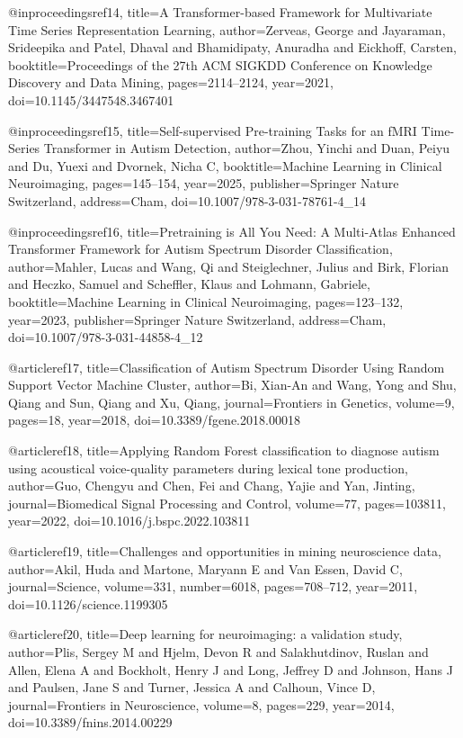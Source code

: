 @inproceedings{ref14,
  title={A Transformer-based Framework for Multivariate Time Series Representation Learning},
  author={Zerveas, George and Jayaraman, Srideepika and Patel, Dhaval and Bhamidipaty, Anuradha and Eickhoff, Carsten},
  booktitle={Proceedings of the 27th ACM SIGKDD Conference on Knowledge Discovery and Data Mining},
  pages={2114--2124},
  year={2021},
  doi={10.1145/3447548.3467401}
}

@inproceedings{ref15,
  title={Self-supervised Pre-training Tasks for an fMRI Time-Series Transformer in Autism Detection},
  author={Zhou, Yinchi and Duan, Peiyu and Du, Yuexi and Dvornek, Nicha C},
  booktitle={Machine Learning in Clinical Neuroimaging},
  pages={145--154},
  year={2025},
  publisher={Springer Nature Switzerland},
  address={Cham},
  doi={10.1007/978-3-031-78761-4_14}
}

@inproceedings{ref16,
  title={Pretraining is All You Need: A Multi-Atlas Enhanced Transformer Framework for Autism Spectrum Disorder Classification},
  author={Mahler, Lucas and Wang, Qi and Steiglechner, Julius and Birk, Florian and Heczko, Samuel and Scheffler, Klaus and Lohmann, Gabriele},
  booktitle={Machine Learning in Clinical Neuroimaging},
  pages={123--132},
  year={2023},
  publisher={Springer Nature Switzerland},
  address={Cham},
  doi={10.1007/978-3-031-44858-4_12}
}
  
@article{ref17,
  title={Classification of Autism Spectrum Disorder Using Random Support Vector Machine Cluster},
  author={Bi, Xian-An and Wang, Yong and Shu, Qiang and Sun, Qiang and Xu, Qiang},
  journal={Frontiers in Genetics},
  volume={9},
  pages={18},
  year={2018},
  doi={10.3389/fgene.2018.00018}
}

@article{ref18,
  title={Applying Random Forest classification to diagnose autism using acoustical voice-quality parameters during lexical tone production},
  author={Guo, Chengyu and Chen, Fei and Chang, Yajie and Yan, Jinting},
  journal={Biomedical Signal Processing and Control},
  volume={77},
  pages={103811},
  year={2022},
  doi={10.1016/j.bspc.2022.103811}
}

@article{ref19,
  title={Challenges and opportunities in mining neuroscience data},
  author={Akil, Huda and Martone, Maryann E and Van Essen, David C},
  journal={Science},
  volume={331},
  number={6018},
  pages={708--712},
  year={2011},
  doi={10.1126/science.1199305}
}

@article{ref20,
  title={Deep learning for neuroimaging: a validation study},
  author={Plis, Sergey M and Hjelm, Devon R and Salakhutdinov, Ruslan and Allen, Elena A and Bockholt, Henry J and Long, Jeffrey D and Johnson, Hans J and Paulsen, Jane S and Turner, Jessica A and Calhoun, Vince D},
  journal={Frontiers in Neuroscience},
  volume={8},
  pages={229},
  year={2014},
  doi={10.3389/fnins.2014.00229}
}

